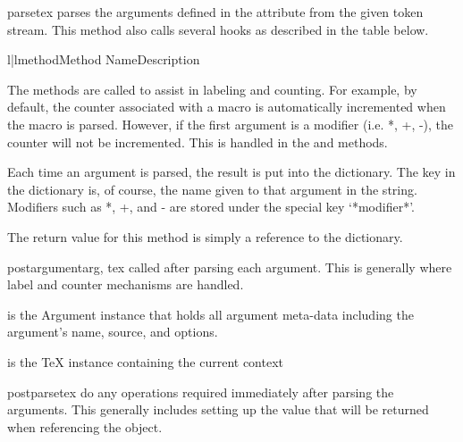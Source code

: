 \begin{methoddesc}[Macro]{parse}{tex}
parses the arguments defined in the  attribute from the given
token stream.  This method also calls several hooks as described in the table
below.

\begin{tableii}{l|l}{method}{Method Name}{Description}
\end{tableii}

The methods are called to assist in labeling and counting.  For example,
by default, the counter associated with a macro is automatically incremented
when the macro is parsed.  However, if the first argument is a modifier 
(i.e. *, +, -), the counter will not be incremented.  This is handled 
in the  and  methods.

Each time an argument is parsed, the result is put into the 
dictionary.  The key in the dictionary is, of course, the name given to that
argument in the  string.  Modifiers such as *, +, and - are
stored under the special key `*modifier*'.

The return value for this method is simply a reference to the 
 dictionary.

\end{methoddesc}

\begin{methoddesc}[Macro]{postargument}{arg, tex}
called after parsing each argument. This is generally where label and
counter mechanisms are handled.

 is the Argument instance that holds all argument meta-data
    including the argument's name, source, and options.

 is the TeX instance containing the current context 
\end{methoddesc}

\begin{methoddesc}[Macro]{postparse}{tex}
do any operations required immediately after parsing the arguments.  This
generally includes setting up the value that will be returned when 
referencing the object.
\end{methoddesc}

